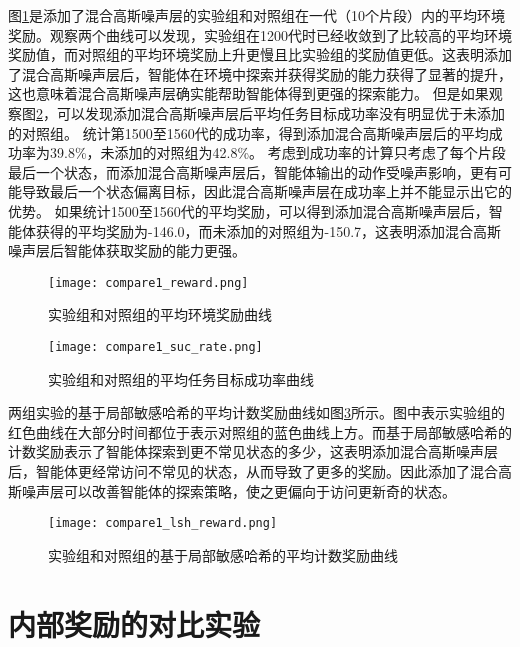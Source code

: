 图\ref{cmp1env_reward}是添加了混合高斯噪声层的实验组和对照组在一代（10个片段）内的平均环境奖励。观察两个曲线可以发现，实验组在1200代时已经收敛到了比较高的平均环境奖励值，而对照组的平均环境奖励上升更慢且比实验组的奖励值更低。这表明添加了混合高斯噪声层后，智能体在环境中探索并获得奖励的能力获得了显著的提升，这也意味着混合高斯噪声层确实能帮助智能体得到更强的探索能力。
但是如果观察图\ref{cmp1suc_rate}，可以发现添加混合高斯噪声层后平均任务目标成功率没有明显优于未添加的对照组。
统计第1500至1560代的成功率，得到添加混合高斯噪声层后的平均成功率为39.8\%，未添加的对照组为42.8\%。
考虑到成功率的计算只考虑了每个片段最后一个状态，而添加混合高斯噪声层后，智能体输出的动作受噪声影响，更有可能导致最后一个状态偏离目标，因此混合高斯噪声层在成功率上并不能显示出它的优势。
如果统计1500至1560代的平均奖励，可以得到添加混合高斯噪声层后，智能体获得的平均奖励为-146.0，而未添加的对照组为-150.7，这表明添加混合高斯噪声层后智能体获取奖励的能力更强。
        \begin{figure}[htpb]
        \centering
        \texttt{[image: compare1\_reward.png]}
        \caption{实验组和对照组的平均环境奖励曲线}
            \label{cmp1env_reward}
        \end{figure}

        \begin{figure}[htpb]
        \centering
        \texttt{[image: compare1\_suc\_rate.png]}
        \caption{实验组和对照组的平均任务目标成功率曲线}
            \label{cmp1suc_rate}
        \end{figure}

两组实验的基于局部敏感哈希的平均计数奖励曲线如图\ref{cmp1lsh_reward}所示。图中表示实验组的红色曲线在大部分时间都位于表示对照组的蓝色曲线上方。而基于局部敏感哈希的计数奖励表示了智能体探索到更不常见状态的多少，这表明添加混合高斯噪声层后，智能体更经常访问不常见的状态，从而导致了更多的奖励。因此添加了混合高斯噪声层可以改善智能体的探索策略，使之更偏向于访问更新奇的状态。
        \begin{figure}[htpb]
        \centering
        \texttt{[image: compare1\_lsh\_reward.png]}
        \caption{实验组和对照组的基于局部敏感哈希的平均计数奖励曲线}
            \label{cmp1lsh_reward}
        \end{figure}

\section{内部奖励的对比实验}

